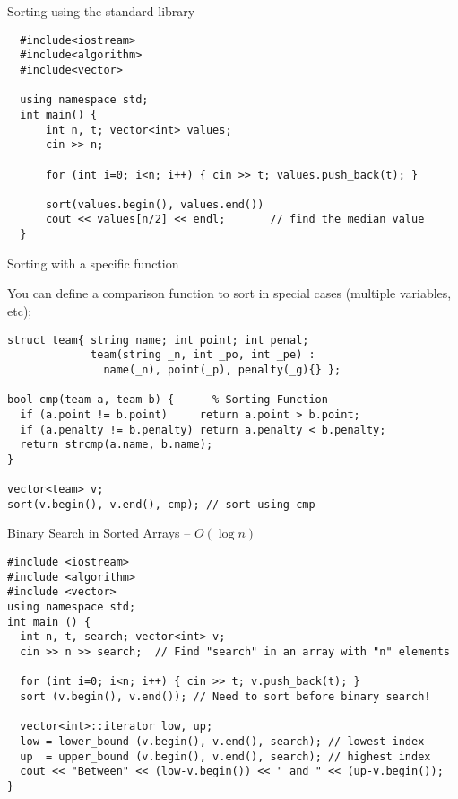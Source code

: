 \begin{frame}[fragile]{Sorting using the standard library}

\begin{verbatim}
  #include<iostream>
  #include<algorithm>
  #include<vector>

  using namespace std;
  int main() {
      int n, t; vector<int> values;
      cin >> n;

      for (int i=0; i<n; i++) { cin >> t; values.push_back(t); }

      sort(values.begin(), values.end())
      cout << values[n/2] << endl;       // find the median value
  }
\end{verbatim}
\end{frame}

\begin{frame}[fragile]{Sorting with a specific function}

You can define a comparison function to sort in special cases (multiple variables, etc);


\begin{verbatim}
struct team{ string name; int point; int penal;
             team(string _n, int _po, int _pe) :
               name(_n), point(_p), penalty(_g){} };

bool cmp(team a, team b) {      % Sorting Function
  if (a.point != b.point)     return a.point > b.point;
  if (a.penalty != b.penalty) return a.penalty < b.penalty;
  return strcmp(a.name, b.name);
}

vector<team> v;
sort(v.begin(), v.end(), cmp); // sort using cmp
\end{verbatim}
\end{frame}

\begin{frame}[fragile]{Binary Search in Sorted Arrays -- $O(\log n)$}

{\small
\begin{verbatim}
#include <iostream>
#include <algorithm>
#include <vector>
using namespace std;
int main () {
  int n, t, search; vector<int> v;
  cin >> n >> search;  // Find "search" in an array with "n" elements

  for (int i=0; i<n; i++) { cin >> t; v.push_back(t); }
  sort (v.begin(), v.end()); // Need to sort before binary search!

  vector<int>::iterator low, up;
  low = lower_bound (v.begin(), v.end(), search); // lowest index
  up  = upper_bound (v.begin(), v.end(), search); // highest index
  cout << "Between" << (low-v.begin()) << " and " << (up-v.begin());
}
\end{verbatim}}
\end{frame}


